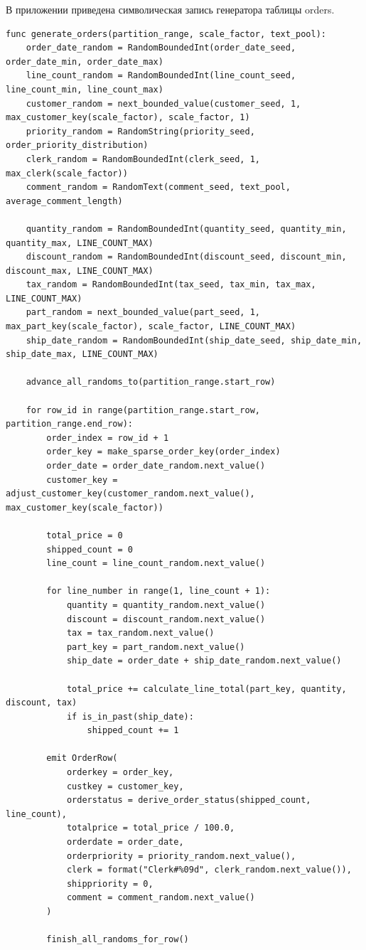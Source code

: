 \setcounter{appendixlstbase}{\value{lstlisting}}
\renewcommand{\thelstlisting}{\Asbuk{appendicesnum}.\number\numexpr\value{lstlisting}-\value{appendixlstbase}\relax}
\label{appendix:orders}

В приложении приведена символическая запись генератора таблицы
orders.

\begin{lstlisting}[style=reportpseudocode,caption={Формирование таблицы orders},label={lst:app-orders}]
func generate_orders(partition_range, scale_factor, text_pool):
    order_date_random = RandomBoundedInt(order_date_seed, order_date_min, order_date_max)
    line_count_random = RandomBoundedInt(line_count_seed, line_count_min, line_count_max)
    customer_random = next_bounded_value(customer_seed, 1, max_customer_key(scale_factor), scale_factor, 1)
    priority_random = RandomString(priority_seed, order_priority_distribution)
    clerk_random = RandomBoundedInt(clerk_seed, 1, max_clerk(scale_factor))
    comment_random = RandomText(comment_seed, text_pool, average_comment_length)

    quantity_random = RandomBoundedInt(quantity_seed, quantity_min, quantity_max, LINE_COUNT_MAX)
    discount_random = RandomBoundedInt(discount_seed, discount_min, discount_max, LINE_COUNT_MAX)
    tax_random = RandomBoundedInt(tax_seed, tax_min, tax_max, LINE_COUNT_MAX)
    part_random = next_bounded_value(part_seed, 1, max_part_key(scale_factor), scale_factor, LINE_COUNT_MAX)
    ship_date_random = RandomBoundedInt(ship_date_seed, ship_date_min, ship_date_max, LINE_COUNT_MAX)

    advance_all_randoms_to(partition_range.start_row)

    for row_id in range(partition_range.start_row, partition_range.end_row):
        order_index = row_id + 1
        order_key = make_sparse_order_key(order_index)
        order_date = order_date_random.next_value()
        customer_key = adjust_customer_key(customer_random.next_value(), max_customer_key(scale_factor))

        total_price = 0
        shipped_count = 0
        line_count = line_count_random.next_value()

        for line_number in range(1, line_count + 1):
            quantity = quantity_random.next_value()
            discount = discount_random.next_value()
            tax = tax_random.next_value()
            part_key = part_random.next_value()
            ship_date = order_date + ship_date_random.next_value()

            total_price += calculate_line_total(part_key, quantity, discount, tax)
            if is_in_past(ship_date):
                shipped_count += 1

        emit OrderRow(
            orderkey = order_key,
            custkey = customer_key,
            orderstatus = derive_order_status(shipped_count, line_count),
            totalprice = total_price / 100.0,
            orderdate = order_date,
            orderpriority = priority_random.next_value(),
            clerk = format("Clerk#%09d", clerk_random.next_value()),
            shippriority = 0,
            comment = comment_random.next_value()
        )

        finish_all_randoms_for_row()
\end{lstlisting}
